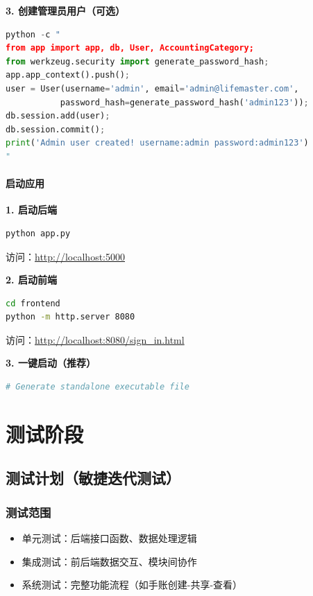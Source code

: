\documentclass[a4paper]{article}
\begin{document}
\textbf{3. 创建管理员用户（可选）}

\begin{lstlisting}[language=python,basicstyle=\ttfamily,breaklines=true]
python -c "
from app import app, db, User, AccountingCategory;
from werkzeug.security import generate_password_hash;
app.app_context().push();
user = User(username='admin', email='admin@lifemaster.com', 
           password_hash=generate_password_hash('admin123'));
db.session.add(user);
db.session.commit();
print('Admin user created! username:admin password:admin123')
"
\end{lstlisting}

\paragraph{启动应用}

\textbf{1. 启动后端}

\begin{lstlisting}[language=bash]
python app.py
\end{lstlisting}

访问：\url{http://localhost:5000}

\textbf{2. 启动前端}

\begin{lstlisting}[language=bash]
cd frontend
python -m http.server 8080
\end{lstlisting}

访问：\url{http://localhost:8080/sign_in.html}

\textbf{3. 一键启动（推荐）}

\begin{lstlisting}[language=bash]
# Generate standalone executable file
\end{lstlisting}

\section{测试阶段}

\subsection{测试计划（敏捷迭代测试）}

\subsubsection{测试范围}

\begin{itemize}
    \item 单元测试：后端接口函数、数据处理逻辑
    \item 集成测试：前后端数据交互、模块间协作
    \item 系统测试：完整功能流程（如手账创建-共享-查看）
\end{itemize}
\end{document}
